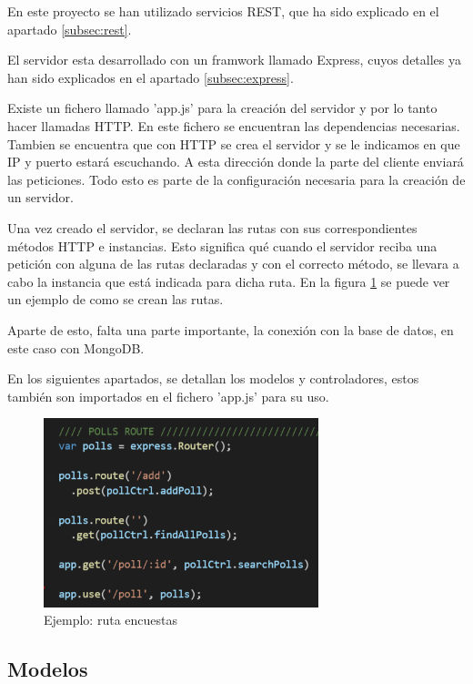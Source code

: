 \documentclass[a4paper, 12pt]{book}
\begin{document}
En este proyecto se han utilizado servicios REST, que ha sido explicado en el apartado \ref{subsec:rest}.

El servidor esta desarrollado con un framwork llamado Express, cuyos detalles ya han sido explicados en el apartado \ref{subsec:express}. 

Existe un fichero llamado 'app.js' para la creaci\'on del servidor y por lo tanto hacer llamadas HTTP. En este fichero se encuentran las dependencias necesarias. Tambien se encuentra que con HTTP se crea el servidor y se le indicamos en que IP y puerto estar\'a escuchando. A esta direcci\'on donde la parte del cliente enviar\'a las peticiones. Todo esto es parte de la configuraci\'on necesaria para la creaci\'on de un servidor.

Una vez creado el servidor, se declaran las rutas con sus correspondientes m\'etodos HTTP e instancias. Esto significa qu\'e cuando el servidor reciba una petici\'on con alguna de las rutas declaradas y con el correcto m\'etodo, se llevara a cabo la instancia que est\'a indicada para dicha ruta. En la figura \ref{f:ej_route} se puede ver un ejemplo de como se crean las rutas.

Aparte de esto, falta una parte importante, la conexi\'on con la base de datos, en este caso con MongoDB.

En los siguientes apartados, se detallan los modelos y controladores, estos tambi\'en son importados en el fichero 'app.js' para su uso.

\begin{figure}[H]
  \centering
  \includegraphics[width=8cm, keepaspectratio]{img/ej_route.png}
  \caption{Ejemplo: ruta encuestas}
  \label{f:ej_route}
\end{figure}



\subsection{Modelos} 
\label{sec:modelos}
\end{document}
